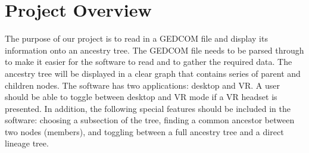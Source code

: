 \documentclass[onecolumn, draftclsnofoot, 10pt, compsoc]{IEEEtran}
\begin{document}
\section{Project Overview }
\begin{singlespace}
The purpose of our project is to read in a GEDCOM file and display its information onto an ancestry tree. The GEDCOM file needs to be parsed through to make it easier for the software to read and to gather the required data. The ancestry tree will be displayed in a clear graph that contains series of parent and children nodes. The software has two applications: desktop and VR. A user should be able to toggle between desktop and VR mode if a VR headset is presented. In addition, the following special features should be included in the software: choosing a subsection of the tree, finding a common ancestor between two nodes (members), and toggling between a full ancestry tree and a direct lineage tree.
\end{singlespace}
\end{document}
